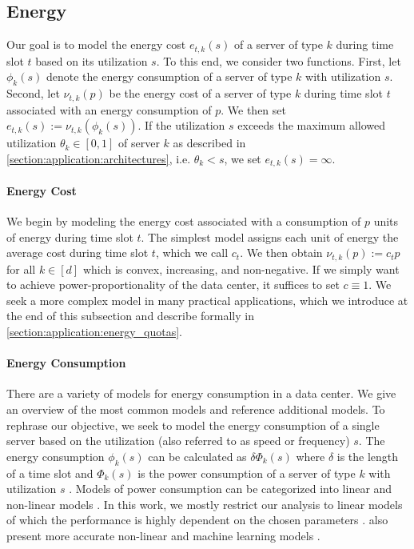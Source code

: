 \subsection{Energy}\label{section:application:operating_cost:energy}

Our goal is to model the energy cost $e_{t,k}(s)$ of a server of type $k$ during time slot $t$ based on its utilization $s$. To this end, we consider two functions. First, let $\phi_k(s)$ denote the energy consumption of a server of type $k$ with utilization $s$. Second, let $\nu_{t,k}(p)$ be the energy cost of a server of type $k$ during time slot $t$ associated with an energy consumption of $p$. We then set $e_{t,k}(s) := \nu_{t,k}(\phi_k(s))$. If the utilization $s$ exceeds the maximum allowed utilization $\theta_k \in [0,1]$ of server $k$ as described in \autoref{section:application:architectures}, i.e. $\theta_k < s$, we set $e_{t,k}(s) = \infty$.

\paragraph{Energy Cost} We begin by modeling the energy cost associated with a consumption of $p$ units of energy during time slot $t$. The simplest model assigns each unit of energy the average cost during time slot $t$, which we call $c_t$. We then obtain $\nu_{t,k}(p) := c_t p$ for all $k \in [d]$ which is convex, increasing, and non-negative. If we simply want to achieve power-proportionality of the data center, it suffices to set $c \equiv 1$. We seek a more complex model in many practical applications, which we introduce at the end of this subsection and describe formally in \autoref{section:application:energy_quotas}.

\paragraph{Energy Consumption} There are a variety of models for energy consumption in a data center. We give an overview of the most common models and reference additional models. To rephrase our objective, we seek to model the energy consumption of a single server based on the utilization (also referred to as speed or frequency) $s$. The energy consumption $\phi_k(s)$ can be calculated as $\delta \Phi_k(s)$ where $\delta$ is the length of a time slot and $\Phi_k(s)$ is the power consumption of a server of type $k$ with utilization $s$ \cite{Dayarathna2016}. Models of power consumption can be categorized into linear and non-linear models \cite{Ismail2020}. In this work, we mostly restrict our analysis to linear models of which the performance is highly dependent on the chosen parameters \cite{Ismail2020}. \citeauthor*{Ismail2020} also present more accurate non-linear and machine learning models \cite{Ismail2020}.

